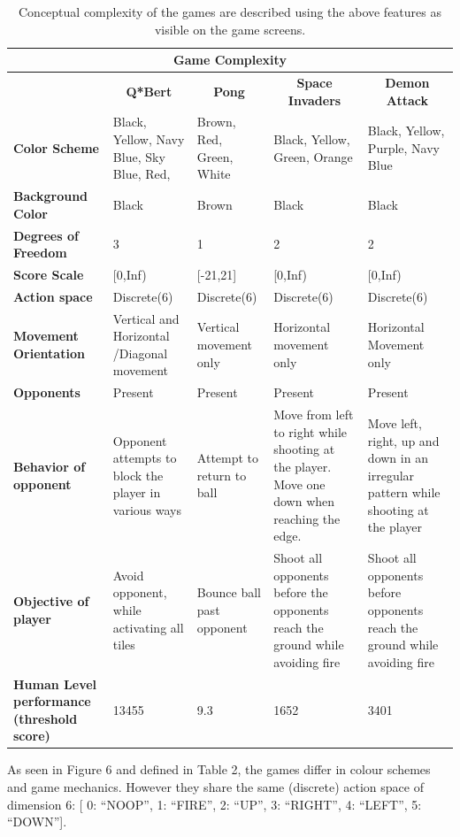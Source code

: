 \begin{table}[]
	\begin{tabular}{p{2cm} p{3cm}p{3cm}p{3cm}p{3cm}}
	\hline
	\multicolumn{5}{c}{\textbf{Game Complexity}} \\
	\hline
	& \multicolumn{1}{c}{\textbf{Q*Bert}} & \multicolumn{1}{c}{\textbf{Pong}} & \multicolumn{1}{c}{\textbf{Space Invaders}} & \multicolumn{1}{c}{\textbf{Demon Attack}} \\
	\rowcolor[HTML]{EFEFEF} 
	\textbf{Color Scheme} & Black, Yellow, Navy Blue, Sky Blue, Red, & Brown, Red, Green, White & Black, Yellow, Green, Orange & Black, Yellow, Purple, Navy Blue \\
	\textbf{Background Color} & Black & Brown & Black & Black \\
	\rowcolor[HTML]{EFEFEF} 
	\textbf{Degrees of Freedom} & 3 & 1 & 2 & 2 \\
	\textbf{Score Scale} & {[}0,Inf) & {[}-21,21{]} & {[}0,Inf) & {[}0,Inf) \\
	\rowcolor[HTML]{EFEFEF} 
	\textbf{Action space} & Discrete(6) & Discrete(6) & Discrete(6) & Discrete(6) \\
	\textbf{Movement Orientation} & Vertical and Horizontal /Diagonal movement & Vertical movement only & Horizontal movement only & Horizontal Movement only \\
	\rowcolor[HTML]{EFEFEF} 
	\textbf{Opponents} & Present & Present & Present & Present \\
	\textbf{Behavior of opponent} & Opponent attempts to block the player in various ways & Attempt to return to ball & Move from left to right while shooting at the player. Move one down when reaching the edge. & Move left, right, up and down in an irregular pattern while shooting at the player \\
	\rowcolor[HTML]{EFEFEF} 
	\textbf{Objective of player} & Avoid opponent, while activating all tiles & Bounce ball past opponent & Shoot all opponents before the opponents reach the ground while avoiding fire & Shoot all opponents before opponents reach the ground while avoiding fire \\
	\textbf{Human Level performance (threshold score)} & 13455 & 9.3 & 1652 & 3401 \\
	\hline
\end{tabular}
\caption{Conceptual complexity of the games are described using the above features as visible on the game screens.}
\end{table}


As seen in Figure 6 and defined in Table 2, the games differ in colour schemes and game mechanics. However they share the same (discrete) action space of dimension 6: [ 0: ``NOOP'', 1: ``FIRE'', 2: ``UP'', 3: ``RIGHT'', 4: ``LEFT'', 5: ``DOWN'']. 

